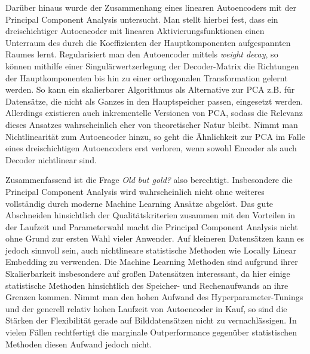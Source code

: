 Darüber hinaus wurde der Zusammenhang eines linearen Autoencoders mit der Principal Component
Analysis untersucht. Man stellt hierbei fest, dass ein dreischichtiger Autoencoder mit linearen
Aktivierungsfunktionen einen Unterraum des durch die Koeffizienten der Hauptkomponenten
aufgespannten Raumes lernt. Regularisiert man den Autoencoder mittels \textit{weight decay}, so
können mithilfe einer Singulärwertzerlegung der Decoder-Matrix die Richtungen der Hauptkomponenten
bis hin zu einer orthogonalen Transformation gelernt werden. So kann ein skalierbarer Algorithmus
als Alternative zur PCA z.B. für Datensätze, die nicht als Ganzes in den Hauptspeicher passen,
eingesetzt werden. Allerdings existieren auch inkrementelle Versionen von PCA, sodass die Relevanz
dieses Ansatzes wahrscheinlich eher von theoretischer Natur bleibt. Nimmt man Nichtlinearität zum
Autoencoder hinzu, so geht die Ähnlichkeit zur PCA im Falle eines dreischichtigen Autoencoders erst
verloren, wenn sowohl Encoder als auch Decoder nichtlinear sind.

Zusammenfassend ist die Frage \textit{Old but gold?} also berechtigt. Insbesondere die Principal
Component Analysis wird wahrscheinlich nicht ohne weiteres vollständig durch moderne Machine
Learning Ansätze abgelöst. Das gute Abschneiden hinsichtlich der Qualitätskriterien zusammen mit
den Vorteilen in der Laufzeit und Parameterwahl macht die Principal Component Analysis nicht ohne
Grund zur ersten Wahl vieler Anwender. Auf kleineren Datensätzen kann es jedoch sinnvoll sein, auch
nichtlineare statistische Methoden wie Locally Linear Embedding zu verwenden. Die Machine Learning
Methoden sind aufgrund ihrer Skalierbarkeit insbesondere auf großen Datensätzen interessant, da
hier einige statistische Methoden hinsichtlich des Speicher- und Rechenaufwands an ihre Grenzen
kommen. Nimmt man den hohen Aufwand des Hyperparameter-Tunings und der generell relativ hohen
Laufzeit von Autoencoder in Kauf, so sind die Stärken der Flexibilität gerade auf Bilddatensätzen
nicht zu vernachlässigen. In vielen Fällen rechtfertigt die marginale Outperformance gegenüber
statistischen Methoden diesen Aufwand jedoch nicht.